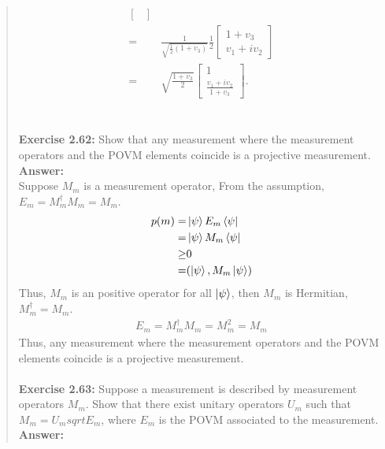 \documentclass[UTF8]{ctexart}
\begin{document}
\begin{quote}
\begin{equation}
\begin{aligned}
\begin{bmatrix}
		\end{bmatrix}\\
		=&\frac{1}{\sqrt{\frac{1}{2}(1+v_{3})}}\frac{1}{2}
		\begin{bmatrix}
			1+v_{3} \\v_{1}+iv_{2}
		\end{bmatrix} \\
		=&\sqrt{\frac{1+v_{3}}{2}}\begin{bmatrix}
			1 \\ \frac{v_{1}+iv_{2}}{1+v_{3}}
		\end{bmatrix}.
	\end{aligned}
\end{equation}
\\
\\
\textbf{Exercise 2.62:  } Show that any measurement where the measurement operators and the
POVM elements coincide is a projective measurement.
\\
\textbf{Answer:}\\
Suppose $M_{m}$ is a measurement operator, From the assumption, 
$E_{m}=M_{m}^{\dagger}M_{m}=M_{m}$.\\
\begin{equation}
	\begin{aligned}
		p(m)=&\ket{\psi}E_{m}\bra{\psi}\\
			=&\ket{\psi}M_{m}\bra{\psi} \\
			\geq&0 \\
			=&(\ket{\psi},M_{m}\ket{\psi})
	\end{aligned}
\end{equation}
Thus, $M_{m}$ is an positive operator for all $\ket{\psi}$, then $M_{m}$
 is Hermitian, $M_{m}^{\dagger}=M_{m}$.\\
 \begin{equation}
	\begin{aligned}
		E_{m}=M_{m}^{\dagger}M_{m}=M_{m}^{2}=M_{m}	
	\end{aligned}
\end{equation}
Thus, any measurement where the measurement operators and the
POVM elements coincide is a projective measurement.
\\
\\
\textbf{Exercise 2.63:} Suppose a measurement is described by measurement operators $M_{m}$.
Show that there exist unitary operators $U_{m}$ such that $M_{m} = U_{m}sqrt{E_{m}}$, where
   $E_{m}$ is the POVM associated to the measurement.
   \\
\textbf{Answer:}\\

\end{quote}
\end{document}
